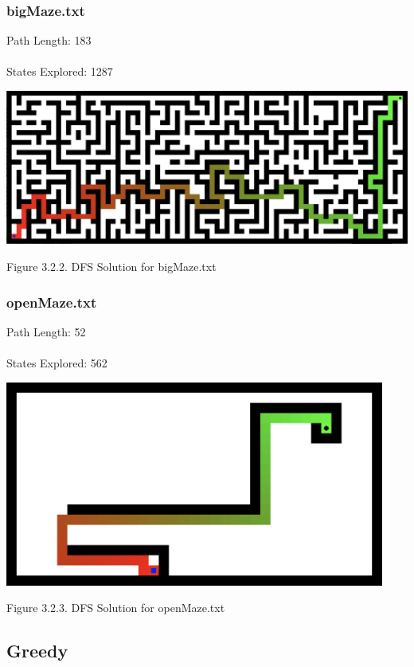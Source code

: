 \documentclass{mcmthesis}
\begin{document}
\subsubsection{bigMaze.txt}
Path Length: 183 \\ \\
States Explored: 1287
\begin{center}
\includegraphics[width=15cm]{dfs_bigmaze.png}
\end{center}
\begin{center}
\small{Figure 3.2.2. DFS Solution for bigMaze.txt}
\end{center}

\subsubsection{openMaze.txt}
Path Length: 52 \\ \\
States Explored: 562
\begin{center}
\includegraphics[width=12.5cm]{dfs_openmaze.png}
\end{center}
\begin{center}
\small{Figure 3.2.3. DFS Solution for openMaze.txt}
\end{center}

\subsection{Greedy}
\end{document}

